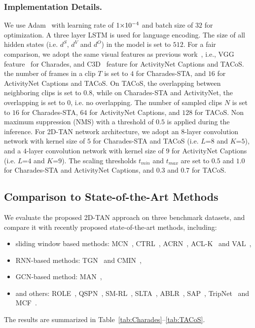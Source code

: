 \documentclass[letterpaper]{article} %
\begin{document}
\subsubsection{Implementation Details.}
We use Adam~\cite{kingma2014adam} with learning rate of $1\small{\times}10^{-4}$
and batch size of $32$ for optimization.
A three layer LSTM is used for language encoding. The size of all hidden states (i.e. $d^S$, $d^V$ and $d^O$) in the model is set to $512$.
For a fair comparison, we adopt the same visual features as previous work~\cite{zhang2019man,zhang2019cross}, i.e., VGG feature~\cite{Simonyan15} for Charades, and C3D~\cite{tran2015learning} feature for ActivityNet Captions and TACoS.
the number of frames in a clip $T$ is set to $4$ for Charades-STA, and $16$ for ActivityNet Captions and TACoS.
On TACoS, the overlapping between neighboring clips is set to 0.8, while on Charades-STA and ActivityNet, the overlapping is set to 0, i.e. no overlapping.
The number of sampled clips $N$ is set to $16$ for Charades-STA, $64$ for ActivityNet Captions, and $128$ for TACoS.
Non maximum suppression (NMS) with a threshold of $0.5$ is applied during the inference.
For 2D-TAN network architecture, we adopt an $8$-layer convolution network with kernel size of $5$ for Charades-STA and TACoS (i.e. $L$=$8$ and $K$=$5$), and a $4$-layer convolution network with kernel size of $9$ for ActivityNet Captions (i.e. $L$=$4$ and $K$=$9$).
The scaling thresholds $t_{min}$ and $t_{max}$ are set to $0.5$ and $1.0$ for Charades-STA and ActivityNet Captions, and $0.3$ and $0.7$ for TACoS.


\subsection{Comparison to State-of-the-Art Methods}
We evaluate the proposed 2D-TAN approach on three benchmark datasets, and compare it with recently proposed state-of-the-art methods, including:
\begin{itemize}[leftmargin=0.38cm]
\item{
sliding window based methods: 
MCN~\cite{hendricks17iccv},  CTRL~\cite{gao2017tall},  ACRN~\cite{liu2018attentive},  ACL-K~\cite{Ge_2019_WACV} and  VAL~\cite{song2018val},}
\item{RNN-based methods: 
TGN~\cite{chen2018temporally} and CMIN~\cite{zhang2019cross},}
\item{
GCN-based method:
MAN~\cite{zhang2019man}, }
\item{
and others:
ROLE~\cite{liu2018crossmodal},  QSPN~\cite{xu2019multilevel},  SM-RL~\cite{wang2019language},  SLTA~\cite{jiang2019cross},  ABLR~\cite{yuan2019to},  SAP~\cite{chen2019semantic}, TripNet~\cite{Hahn2019tripping} and MCF~\cite{wu2018multi}.}
\end{itemize}
The results are summarized in Table~\ref{tab:Charades}--\ref{tab:TACoS}.
\end{document}
